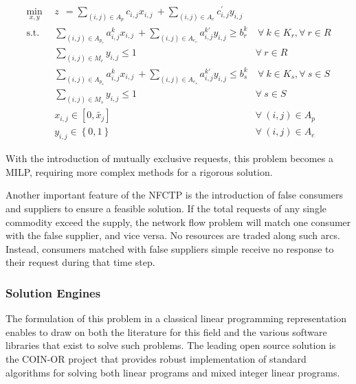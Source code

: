 \begin{subequations}\label{eqs:NFCTP}
  \begin{align}
    \min_{x, y} \:\: 
    & 
    z \:\: = 
    \sum_{(i, j) \in A_p} c_{i,j} x_{i,j} 
    \: + 
    \sum_{(i, j) \in A_e} c^{\prime}_{i,j} y_{i,j} 
    & 
    \label{eqs:NFCTP_obj} \\
    \text{s.t.} \:\:
    &
    \sum_{(i, j) \in A_{p_r}} a^k_{i,j} x_{i,j}
    \: + 
    \sum_{(i, j) \in A_{e_r}} a^{k\prime}_{i,j} y_{i,j}
    \geq b^k_r 
    &
    \: 
    \forall \: k \in K_r,  
    \forall \: r \in R 
    \label{eqs:NFCTP_req} \\
    &
    \sum_{(i, j) \in M_{r}} y_{i,j} \leq 1 
    &
    \forall \: r \in R 
    \label{eqs:NFCTP_mut_req} \\
    &
    \sum_{(i, j) \in A_{p_s}} a^k_{i,j} x_{i,j}
    \: + 
    \sum_{(i, j) \in A_{e_s}} a^{k\prime}_{i,j} y_{i,j}
    \leq b^k_s 
    &
    \: 
    \forall \: k \in K_s, 
    \forall \: s \in S 
    \label{eqs:NFCTP_sup} \\
    &
    \sum_{(i, j) \in M_{s}} y_{i,j} \leq 1 
    &
    \forall \: s \in S 
    \label{eqs:NFCTP_mut_sup} \\
    &
    x_{i,j} \in [0, \tilde{x_j}]
    &
    \forall \: (i, j) \in A_p
    \label{eqs:NFCTP_x} \\
    &
    y_{i,j} \in \left\{ 0, 1 \right\}
    &
    \forall \: (i, j) \in A_e
    \label{eqs:NFCTP_y}
  \end{align}
\end{subequations}

With the introduction of mutually exclusive requests, this problem becomes a
\gls{MILP}, requiring more complex methods for a rigorous solution.

Another important feature of the \gls{NFCTP} is the introduction of false
consumers and suppliers to ensure a feasible solution.  If the total requests
of any single commodity exceed the supply, the network flow problem will match
one consumer with the false supplier, and vice versa.  No resources are traded
along such arcs.  Instead, consumers matched with false suppliers simple
receive no response to their request during that time step.

\subsubsection{Solution Engines}

The formulation of this problem in a classical linear programming
representation enables \Cyclus{} to draw on both the literature for this field
and the various software libraries that exist to solve such problems.  The
leading open source solution is the \gls{COIN-OR} project  that
provides robust implementation of standard algorithms for solving both linear
programs and mixed integer linear programs.

